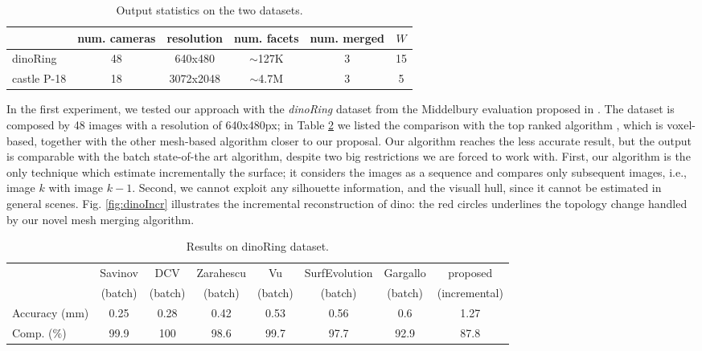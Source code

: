\begin{table}[t]
\footnotesize
\centering
  \caption{Output statistics on the two datasets.}
  \label{fig:expData}
\begin{tabular}{lccccc}
&num. cameras& resolution&num. facets& num. merged &$W$ \\
\hline
dinoRing&48&640x480&$\sim$127K&3&15\\
castle P-18&18&3072x2048&$\sim$4.7M&3&5\\
\end{tabular}
\end{table}

In the first experiment, we tested our approach with the \emph{dinoRing} dataset  from the Middelbury evaluation proposed in \cite{seitz2006comparison}. 
The dataset is composed by 48 images with a resolution of 640x480px; in Table \ref{tab:dinoRes} we listed the comparison with the top ranked algorithm \cite{savinov2016semantic}, which is voxel-based, together with the other mesh-based algorithm closer to our proposal.
Our algorithm reaches the less accurate result, but  the output is comparable with the batch state-of-the art algorithm, despite two big restrictions we are forced to work with.
First, our algorithm is the only technique  which estimate incrementally the surface; it considers the images as a sequence and compares only subsequent images, i.e., image $k$ with image $k-1$.
Second, we cannot exploit any silhouette information, and the visuall hull, since it cannot be estimated in general scenes.
Fig. \ref{fig:dinoIncr} illustrates the incremental reconstruction of dino: the red circles underlines the topology change handled by our novel mesh merging algorithm.

\begin{table}[t]
\scriptsize
\centering
  \caption{Results on dinoRing dataset.}
  \label{tab:dinoRes}
\begin{tabular}{lccccccc}
\hline
&Savinov\cite{savinov2016semantic}&DCV\cite{li2015detail}&Zarahescu\cite{zaharescu2007transformesh}&Vu\cite{hiep2009towards}&SurfEvolution&Gargallo\cite{gargallo2007minimizing}&proposed\\
&(batch)&(batch)&(batch)&(batch)&(batch)&(batch)&(incremental)\\
Accuracy (mm) &0.25&0.28&0.42&0.53&0.56&0.6&1.27\\
Comp. (\%)&99.9&100&98.6&99.7&97.7&92.9&87.8
\end{tabular}
\end{table}



